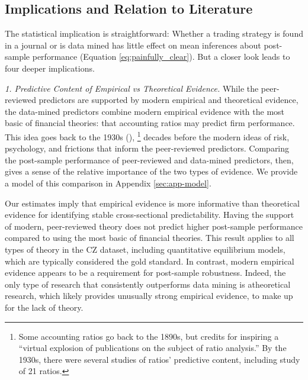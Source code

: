 \subsection*{Implications and Relation to Literature}

The statistical implication is straightforward: Whether a trading strategy is found in a journal or is data mined has little effect on mean inferences about post-sample performance (Equation \eqref{eq:painfully_clear}). But a closer look leads to four deeper implications.

\textit{1. Predictive Content of Empirical vs Theoretical Evidence.} 
While the peer-reviewed predictors are supported by modern empirical and theoretical evidence, the data-mined predictors combine modern empirical evidence with the most basic of financial theories: that accounting ratios may predict firm performance. This idea goes back to the 1930s (\citealt{horrigan1968short}),%
\footnote{%
Some accounting ratios go back to the 1890s, but \citet{horrigan1968short} credits \citet{wall1919credit} for inspiring a ``virtual explosion of publications on the subject of ratio analysis.'' By the 1930s, there were several studies of ratios' predictive content, including  study of 21 ratios.} %
decades before the modern ideas of risk, psychology, and frictions that inform the peer-reviewed predictors. Comparing the post-sample performance of peer-reviewed and data-mined predictors, then, gives a sense of the relative importance of the two types of evidence. We provide a model of this comparison in Appendix \ref{sec:app-model}.

Our estimates imply that empirical evidence is more informative than theoretical evidence for identifying stable cross-sectional predictability. Having the support of modern, peer-reviewed theory does not predict higher post-sample performance compared to using the most basic of financial theories. This result applies to all types of theory in the CZ dataset, including quantitative equilibrium models, which are typically considered the gold standard. In contrast, modern empirical evidence appears to be a requirement for post-sample robustness. Indeed, the only type of research that consistently outperforms data mining is atheoretical research, which likely provides unusually strong empirical evidence, to make up for the lack of theory. 


